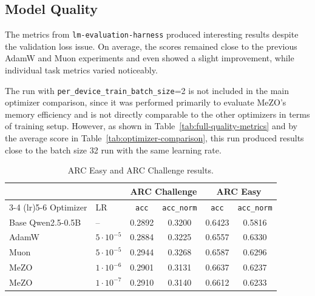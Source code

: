 \documentclass{article}
\begin{document}
\subsection{Model Quality}

\begin{table}[ht]
\centering
{}
\caption{Main quality metrics}
\label{tab:optimizer-comparison}
\end{table}

The metrics from \texttt{lm-evaluation-harness} produced interesting results despite the validation loss issue. On average, the scores remained close to the previous AdamW and Muon experiments and even showed a slight improvement, while individual task metrics varied noticeably.

The run with \texttt{per\_device\_train\_batch\_size}=2 is not included in the main optimizer comparison, since it was performed primarily to evaluate MeZO's memory efficiency and is not directly comparable to the other optimizers in terms of training setup. However, as shown in Table~\ref{tab:full-quality-metrics} and by the average score in Table~\ref{tab:optimizer-comparison}, this run produced results close to the batch size 32 run with the same learning rate.

\begin{table}[ht]
\centering
\begin{tabular}{llcccc}
\toprule
& & \multicolumn{2}{c}{ARC Challenge} & \multicolumn{2}{c}{ARC Easy} \\
\cmidrule(lr){3-4} \cmidrule(lr){5-6}
Optimizer & LR
& \texttt{acc} & \texttt{acc\_norm}
& \texttt{acc} & \texttt{acc\_norm} \\
\midrule
Base Qwen2.5-0.5B & -- & 0.2892 & 0.3200 & 0.6423 & 0.5816 \\
\midrule
AdamW    & $5 \cdot 10^{-5}$ & 0.2884 & 0.3225 & 0.6557 & 0.6330 \\
Muon     & $5 \cdot 10^{-5}$ & 0.2944 & 0.3268 & 0.6587 & 0.6296 \\
MeZO & $1 \cdot 10^{-6}$ & 0.2901 & 0.3131 & 0.6637 & 0.6237 \\
MeZO & $1 \cdot 10^{-7}$ & 0.2910 & 0.3140 & 0.6612 & 0.6233 \\
\bottomrule
\end{tabular}
\caption{ARC Easy and ARC Challenge results.}
\label{tab:arc-results}
\end{table}
\end{document}
